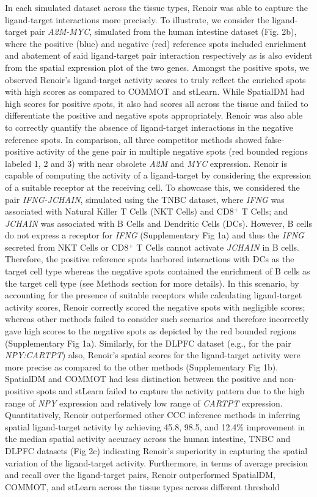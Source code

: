 In each simulated dataset across the tissue types, Renoir was able to capture the ligand-target interactions more precisely. To illustrate, we consider the ligand-target pair \textit{A2M-MYC}, simulated from the human intestine dataset (Fig. 2b), where the positive (blue) and negative (red) reference spots included enrichment and abatement of said ligand-target pair interaction respectively as is also evident from the spatial expression plot of the two genes. Amongst the positive spots, we observed Renoir's ligand-target activity scores to truly reflect the enriched spots with high scores as compared to COMMOT and stLearn. While SpatialDM had high scores for positive spots, it also had scores all across the tissue and failed to differentiate the positive and negative spots appropriately. Renoir was also able to correctly quantify the absence of ligand-target interactions in the negative reference spots. In comparison, all three competitor methods showed false-positive activity of the gene pair in multiple negative spots (red bounded regions labeled 1, 2 and 3) with near obsolete \textit{A2M} and \textit{MYC} expression. Renoir is capable of computing the activity of a ligand-target by considering the expression of a suitable receptor at the receiving cell. To showcase this, we considered the pair \textit{IFNG-JCHAIN}, simulated using the TNBC dataset, where \textit{IFNG} was associated with Natural Killer T Cells (NKT Cells) and CD8$^{+}$ T Cells; and \textit{JCHAIN} was associated with B Cells and Dendritic Cells (DCs). However, B cells do not express a receptor for \textit{IFNG} (Supplementary Fig 1a) and thus the \textit{IFNG} secreted from NKT Cells or CD8$^{+}$ T Cells cannot activate \textit{JCHAIN} in B cells. Therefore, the positive reference spots harbored interactions with DCs as the target cell type whereas the negative spots contained the enrichment of B cells as the target cell type (see Methods section for more details). In this scenario, by accounting for the presence of suitable receptors while calculating ligand-target activity scores, Renoir correctly scored the negative spots with negligible scores; whereas other methods failed to consider such scenarios and therefore incorrectly gave high scores to the negative spots as depicted by the red bounded regions (Supplementary Fig 1a). Similarly, for the DLPFC dataset (e.g., for the pair \textit{NPY:CARTPT}) also, Renoir's spatial scores for the ligand-target activity were more precise as compared to the other methods (Supplementary Fig 1b). SpatialDM and COMMOT had less distinction between the positive and non-positive spots and stLearn failed to capture the activity pattern due to the high range of \textit{NPY} expression and relatively low range of \textit{CARTPT} expression. Quantitatively, Renoir outperformed other CCC inference methods in inferring spatial ligand-target activity by achieving 45.8, 98.5, and 12.4\% improvement in the median spatial activity accuracy across the human intestine, TNBC and DLPFC datasets (Fig 2c) indicating Renoir's superiority in capturing the spatial variation of the ligand-target activity. Furthermore, in terms of average precision and recall over the ligand-target pairs, Renoir outperformed SpatialDM, COMMOT, and stLearn across the tissue types across different threshold 